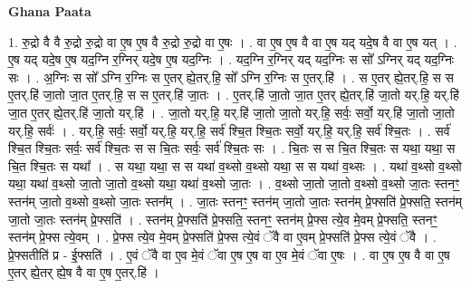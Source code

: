 \documentclass[17pt]{extarticle}
\begin{document}
\textbf{Ghana Paata } \newline

1. रु॒द्रो वै वै रु॒द्रो रु॒द्रो वा ए॒ष ए॒ष वै रु॒द्रो रु॒द्रो वा ए॒षः । . वा ए॒ष ए॒ष वै वा ए॒ष यद् यदे॒ष वै वा ए॒ष यत् । . ए॒ष यद् यदे॒ष ए॒ष यद॒ग्नि र॒ग्निर् यदे॒ष ए॒ष यद॒ग्निः । . यद॒ग्नि र॒ग्निर् यद् यद॒ग्निः स सो᳚ ऽग्निर् यद् यद॒ग्निः सः । . अ॒ग्निः स सो᳚ ऽग्नि र॒ग्निः स ए॒तर् ह्ये॒तर्.हि॒ सो᳚ ऽग्नि र॒ग्निः स ए॒तर्.हि॑ । . स ए॒तर् ह्ये॒तर्.हि॒ स स ए॒तर्.हि॑ जा॒तो जा॒त ए॒तर्.हि॒ स स ए॒तर्.हि॑ जा॒तः । . ए॒तर्.हि॑ जा॒तो जा॒त ए॒तर् ह्ये॒तर्.हि॑ जा॒तो यर्.हि॒ यर्.हि॑ जा॒त ए॒तर् ह्ये॒तर्.हि॑ जा॒तो यर्.हि॑ । . जा॒तो यर्.हि॒ यर्.हि॑ जा॒तो जा॒तो यर्.हि॒ सर्वः॒ सर्वो॒ यर्.हि॑ जा॒तो जा॒तो यर्.हि॒ सर्वः॑ । . यर्.हि॒ सर्वः॒ सर्वो॒ यर्.हि॒ यर्.हि॒ सर्व॑ श्चि॒त श्चि॒तः सर्वो॒ यर्.हि॒ यर्.हि॒ सर्व॑ श्चि॒तः । . सर्व॑ श्चि॒त श्चि॒तः सर्वः॒ सर्व॑ श्चि॒तः स स चि॒तः सर्वः॒ सर्व॑ श्चि॒तः सः । . चि॒तः स स चि॒त श्चि॒तः स यथा॒ यथा॒ स चि॒त श्चि॒तः स यथा᳚ । . स यथा॒ यथा॒ स स यथा॑ व॒थ्सो व॒थ्सो यथा॒ स स यथा॑ व॒थ्सः । . यथा॑ व॒थ्सो व॒थ्सो यथा॒ यथा॑ व॒थ्सो जा॒तो जा॒तो व॒थ्सो यथा॒ यथा॑ व॒थ्सो जा॒तः । . व॒थ्सो जा॒तो जा॒तो व॒थ्सो व॒थ्सो जा॒तः स्तनꣳ॒॒ स्तन॑म् जा॒तो व॒थ्सो व॒थ्सो जा॒तः स्तन᳚म् । . जा॒तः स्तनꣳ॒॒ स्तन॑म् जा॒तो जा॒तः स्तन॑म् प्रे॒फ्सति॑ प्रे॒फ्सति॒ स्तन॑म् जा॒तो जा॒तः स्तन॑म् प्रे॒फ्सति॑ । . स्तन॑म् प्रे॒फ्सति॑ प्रे॒फ्सति॒ स्तनꣳ॒॒ स्तन॑म् प्रे॒फ्स त्ये॒व मे॒वम् प्रे॒फ्सति॒ स्तनꣳ॒॒ स्तन॑म् प्रे॒फ्स त्ये॒वम् । . प्रे॒फ्स त्ये॒व मे॒वम् प्रे॒फ्सति॑ प्रे॒फ्स त्ये॒वं ॅवै वा ए॒वम् प्रे॒फ्सति॑ प्रे॒फ्स त्ये॒वं ॅवै । . प्रे॒फ्सतीति॑ प्र - ई॒फ्सति॑ । . ए॒वं ॅवै वा ए॒व मे॒वं ॅवा ए॒ष ए॒ष वा ए॒व मे॒वं ॅवा ए॒षः । . वा ए॒ष ए॒ष वै वा ए॒ष ए॒तर् ह्ये॒तर् ह्ये॒ष वै वा ए॒ष ए॒तर्.हि॑ । \newline
\end{document}
